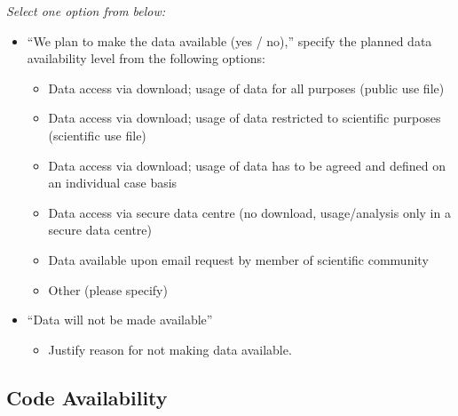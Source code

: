 \documentclass[
]{article}
\providecommand{\tightlist}{%
  \setlength{\itemsep}{0pt}\setlength{\parskip}{0pt}}
\begin{document}
\begin{tcolorbox}[enhanced jigsaw, opacitybacktitle=0.6, bottomrule=.15mm, leftrule=.75mm, rightrule=.15mm, colbacktitle=quarto-callout-caution-color!10!white, toprule=.15mm, titlerule=0mm, left=2mm, colframe=quarto-callout-caution-color-frame, breakable, title=\textcolor{quarto-callout-caution-color}{\faFire}\hspace{0.5em}{Preregistration Item}, opacityback=0, coltitle=black, bottomtitle=1mm, colback=white, toptitle=1mm, arc=.35mm]

\emph{Select one option from below:}

\begin{itemize}
\tightlist
\item[$\square$]
  ``We plan to make the data available (yes / no),'' specify the planned
  data availability level from the following options:

  \begin{itemize}
  \tightlist
  \item
    Data access via download; usage of data for all purposes (public use
    file)
  \item
    Data access via download; usage of data restricted to scientific
    purposes (scientific use file)
  \item
    Data access via download; usage of data has to be agreed and defined
    on an individual case basis
  \item
    Data access via secure data centre (no download, usage/analysis only
    in a secure data centre)
  \item
    Data available upon email request by member of scientific community
  \item
    Other (please specify)
  \end{itemize}
\item[$\square$]
  ``Data will not be made available''

  \begin{itemize}
  \tightlist
  \item[$\square$]
    Justify reason for not making data available.
  \end{itemize}
\end{itemize}

\end{tcolorbox}

\subsection*{Code Availability}\label{code-availability}
\end{document}
